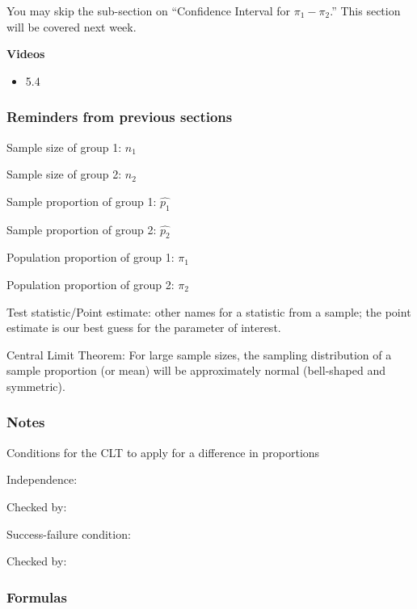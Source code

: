\documentclass[
]{report}
\providecommand{\tightlist}{%
  \setlength{\itemsep}{0pt}\setlength{\parskip}{0pt}}
\newcommand{\rgs}{\vspace{12pt}} %
\newcommand{\rgi}{\hspace{24pt}}  %
\begin{document}
You may skip the sub-section on ``Confidence Interval for \(\pi_1 - \pi_2\).'' This section will be covered next week.


\textbf{Videos}

\begin{itemize}
\tightlist
\item
  5.4
\end{itemize}


\hypertarget{reminders-from-previous-sections-4}{%
\subsubsection*{Reminders from previous sections}\label{reminders-from-previous-sections-4}}

Sample size of group 1: \(n_1\)

Sample size of group 2: \(n_2\)

Sample proportion of group 1: \(\hat{p_1}\)

Sample proportion of group 2: \(\hat{p_2}\)

Population proportion of group 1: \(\pi_1\)

Population proportion of group 2: \(\pi_2\)

Test statistic/Point estimate: other names for a statistic from a sample; the point estimate is our best guess for the parameter of interest.

Central Limit Theorem: For large sample sizes, the sampling distribution of a sample proportion (or mean) will be approximately normal (bell-shaped and symmetric).

\hypertarget{notes-21}{%
\subsubsection*{Notes}\label{notes-21}}

Conditions for the CLT to apply for a difference in proportions

\rgi Independence:
\rgs

\rgi \rgi Checked by:
\rgs

\rgi Success-failure condition:
\rgs

\rgi \rgi Checked by:
\rgs

\hypertarget{formulas-6}{%
\subsubsection*{Formulas}\label{formulas-6}}
\end{document}
